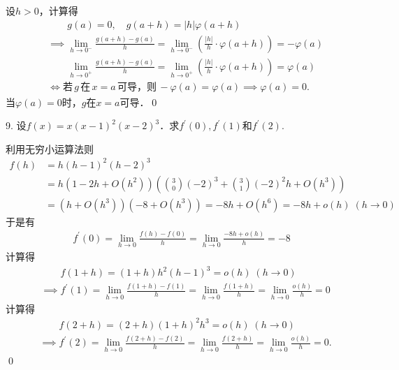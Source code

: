 设$h>0$，计算得
\begin{align}
    &\mathrel{\phantom{\implies}} g(a) = 0, \quad g(a+h) = \lvert h \rvert \varphi (a+h) \\
    &\implies \lim_{h \to 0^-} \frac{g(a+h)-g(a)}{h} = \lim_{h \to 0^-} \left( \frac{\lvert h \rvert}{h} \cdot \varphi (a+h) \right) = -\varphi (a) \\
    &\mathrel{\phantom{\implies}} \lim_{h \to 0^+} \frac{g(a+h)-g(a)}{h} = \lim_{h \to 0^+} \left(\frac{\lvert h \rvert}{h} \cdot \varphi (a+h)\right) = \varphi (a) \\
    &\iff \text{若} \, g  \, \text{在} \, x=a \, \text{可导，则} \, - \varphi (a) = \varphi (a) \implies \varphi (a) = 0.
\end{align}
当$ \varphi (a)=0$时，$g$在$x=a$可导．\qed\bigskip

9. 设$f(x) = x(x-1)^2(x-2)^3$．求$f^{\prime}(0), f^{\prime}(1)$和$f^{\prime}(2)$.

\solve 利用无穷小运算法则
\begin{align}
    f(h) &= h(h-1)^2(h-2)^3 \\
    &= h (1 - 2h + O(h^2))(\binom{3}{0}(-2)^3 + \binom{3}{1} (-2)^2 h + O(h^3)) \\
    &= (h + O(h^3))(-8 + O(h^3)) = -8h + O(h^6) = -8h + o(h) \; (h \to 0)
\end{align}
于是有
\begin{align}
    f^{\prime}(0) = \lim_{h \to 0} \frac{f(h)-f(0)}{h} = \lim_{h \to 0} \frac{-8h + o(h)}{h} = -8
\end{align}
计算得
\begin{align}
    &\mathrel{\phantom{\implies}} f(1+h) = (1+h)h^2 (h-1)^3 = o(h) \; (h \to 0) \\
    &\implies f^{\prime}(1) = \lim_{h \to 0} \frac{f(1+h)-f(1)}{h} = \lim_{h \to 0} \frac{f(1+h)}{h} = \lim_{h \to 0} \frac{o(h)}{h} = 0
\end{align}
计算得
\begin{align}
    &\mathrel{\phantom{\implies}} f(2+h) = (2+h)(1+h)^2 h^3 = o(h) \; (h \to 0) \\
    &\implies f^{\prime}(2) = \lim_{h \to 0} \frac{f(2+h)-f(2)}{h} = \lim_{h \to 0} \frac{f(2+h)}{h} = \lim_{h \to 0} \frac{o(h)}{h} = 0.
\end{align}
\qed\bigskip